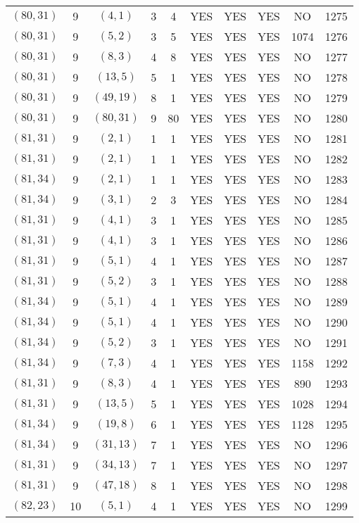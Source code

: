 \begin{longtable}{|c|c|c|c|c|c|c|c|c|c|}
$(80, 31)$ & 9 & $(4, 1)$ & 3 & 4 & YES & YES & YES & NO & 1275\\
$(80, 31)$ & 9 & $(5, 2)$ & 3 & 5 & YES & YES & YES & 1074 & 1276\\
$(80, 31)$ & 9 & $(8, 3)$ & 4 & 8 & YES & YES & YES & NO & 1277\\
$(80, 31)$ & 9 & $(13, 5)$ & 5 & 1 & YES & YES & YES & NO & 1278\\
$(80, 31)$ & 9 & $(49, 19)$ & 8 & 1 & YES & YES & YES & NO & 1279\\
$(80, 31)$ & 9 & $(80, 31)$ & 9 & 80 & YES & YES & YES & NO & 1280\\
$(81, 31)$ & 9 & $(2, 1)$ & 1 & 1 & YES & YES & YES & NO & 1281\\
$(81, 31)$ & 9 & $(2, 1)$ & 1 & 1 & YES & YES & YES & NO & 1282\\
$(81, 34)$ & 9 & $(2, 1)$ & 1 & 1 & YES & YES & YES & NO & 1283\\
$(81, 34)$ & 9 & $(3, 1)$ & 2 & 3 & YES & YES & YES & NO & 1284\\
$(81, 31)$ & 9 & $(4, 1)$ & 3 & 1 & YES & YES & YES & NO & 1285\\
$(81, 31)$ & 9 & $(4, 1)$ & 3 & 1 & YES & YES & YES & NO & 1286\\
$(81, 31)$ & 9 & $(5, 1)$ & 4 & 1 & YES & YES & YES & NO & 1287\\
$(81, 31)$ & 9 & $(5, 2)$ & 3 & 1 & YES & YES & YES & NO & 1288\\
$(81, 34)$ & 9 & $(5, 1)$ & 4 & 1 & YES & YES & YES & NO & 1289\\
$(81, 34)$ & 9 & $(5, 1)$ & 4 & 1 & YES & YES & YES & NO & 1290\\
$(81, 34)$ & 9 & $(5, 2)$ & 3 & 1 & YES & YES & YES & NO & 1291\\
$(81, 34)$ & 9 & $(7, 3)$ & 4 & 1 & YES & YES & YES & 1158 & 1292\\
$(81, 31)$ & 9 & $(8, 3)$ & 4 & 1 & YES & YES & YES & 890 & 1293\\
$(81, 31)$ & 9 & $(13, 5)$ & 5 & 1 & YES & YES & YES & 1028 & 1294\\
$(81, 34)$ & 9 & $(19, 8)$ & 6 & 1 & YES & YES & YES & 1128 & 1295\\
$(81, 34)$ & 9 & $(31, 13)$ & 7 & 1 & YES & YES & YES & NO & 1296\\
$(81, 31)$ & 9 & $(34, 13)$ & 7 & 1 & YES & YES & YES & NO & 1297\\
$(81, 31)$ & 9 & $(47, 18)$ & 8 & 1 & YES & YES & YES & NO & 1298\\
$(82, 23)$ & 10 & $(5, 1)$ & 4 & 1 & YES & YES & YES & NO & 1299\\

\end{longtable}
